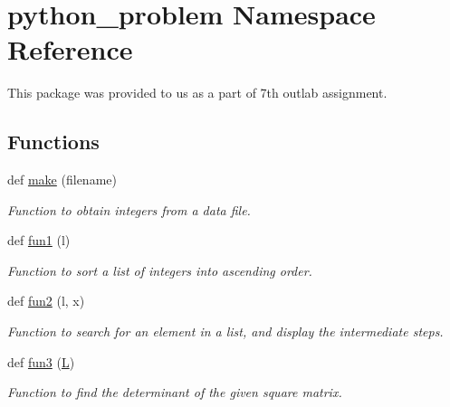 \hypertarget{namespacepython__problem}{}\section{python\+\_\+problem Namespace Reference}
\label{namespacepython__problem}


This package was provided to us as a part of 7th outlab assignment.  


\subsection*{Functions}
\begin{DoxyCompactItemize}
\item 
def \hyperlink{namespacepython__problem_a3e14eabd673d5450fc9ad0f55944ddbc}{make} (filename)
\begin{DoxyCompactList}\small\item\em Function to obtain integers from a data file. \end{DoxyCompactList}\item 
def \hyperlink{namespacepython__problem_aa5fcea23fc1ba14c5e21dfeb25a73376}{fun1} (l)
\begin{DoxyCompactList}\small\item\em Function to sort a list of integers into ascending order. \end{DoxyCompactList}\item 
def \hyperlink{namespacepython__problem_aeb8631d95a0e5c21716de1efa0a93f88}{fun2} (l, x)
\begin{DoxyCompactList}\small\item\em Function to search for an element in a list, and display the intermediate steps. \end{DoxyCompactList}\item 
def \hyperlink{namespacepython__problem_aecd5932c95cd5087a63f7a9cdd9a9261}{fun3} (\hyperlink{namespacepython__problem_a57cd50d64eeaf609bf3db7738032930d}{L})
\begin{DoxyCompactList}\small\item\em Function to find the determinant of the given square matrix. \end{DoxyCompactList}\end{DoxyCompactItemize}
